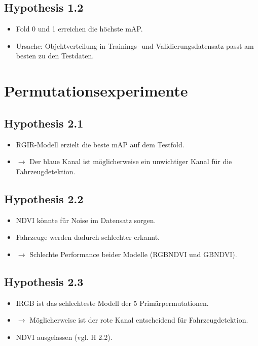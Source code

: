 \subsection*{Hypothesis 1.2}
\begin{itemize}
  \item Fold 0 und 1 erreichen die höchste mAP.
  \item Ursache: Objektverteilung in Trainings- und Validierungsdatensatz passt am besten zu den Testdaten.
\end{itemize}


\section{Permutationsexperimente}

\subsection*{Hypothesis 2.1}
\begin{itemize}
  \item RGIR-Modell erzielt die beste mAP auf dem Testfold.
  \item $\rightarrow$ Der blaue Kanal ist möglicherweise ein unwichtiger Kanal für die Fahrzeugdetektion.
\end{itemize}

\subsection*{Hypothesis 2.2}
\begin{itemize}
  \item NDVI könnte für Noise im Datensatz sorgen.
  \item Fahrzeuge werden dadurch schlechter erkannt.
  \item $\rightarrow$ Schlechte Performance beider Modelle (RGBNDVI und GBNDVI).
\end{itemize}

\subsection*{Hypothesis 2.3}
\begin{itemize}
  \item IRGB ist das schlechteste Modell der 5 Primärpermutationen.
  \item $\rightarrow$ Möglicherweise ist der rote Kanal entscheidend für Fahrzeugdetektion.
  \item NDVI ausgelassen (vgl. H 2.2).
\end{itemize}

